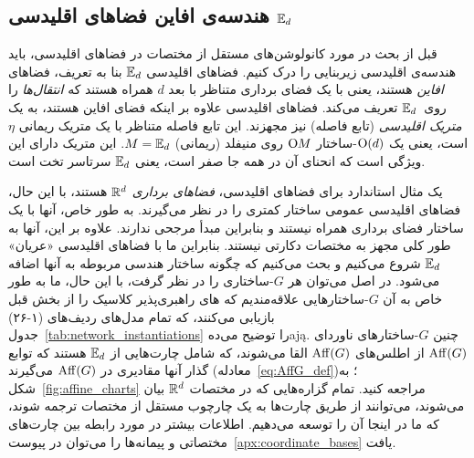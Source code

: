 

\subsection
[هندسه‌ی افاین فضاهای اقلیدسی \texorpdfstring{$\Euc_d$}{}]%
{هندسه‌ی افاین فضاهای اقلیدسی $\Euc_d$}
\label{sec:euclidean_geometry}


قبل از بحث در مورد کانولوشن‌های مستقل از مختصات در فضاهای اقلیدسی، باید هندسه‌ی اقلیدسی زیربنایی را درک کنیم.
فضاهای اقلیدسی $\Euc_d$ بنا به تعریف، فضاهای \emph{افاین} هستند، یعنی با یک فضای برداری متناظر با بعد $d$ همراه هستند که \emph{انتقال‌ها} را روی~$\Euc_d$ تعریف می‌کند.
فضاهای اقلیدسی علاوه بر اینکه فضای افاین هستند، به یک \emph{متریک اقلیدسی} (تابع فاصله) نیز مجهزند.
این تابع فاصله متناظر با یک متریک ریمانی $\eta$ است، یعنی یک $\operatorname{O}(d)$-ساختار $\operatorname{O}\mkern-3.6muM$ روی منیفلد (ریمانی) $M=\mathbb{E}_d$.
این متریک دارای این ویژگی است که انحنای آن در همه جا صفر است، یعنی $\Euc_d$ سرتاسر تخت است.


یک مثال استاندارد برای فضاهای اقلیدسی، \emph{فضاهای برداری} $\mathbb{R}^d$ هستند، با این حال، فضاهای اقلیدسی عمومی ساختار کمتری را در نظر می‌گیرند.
به طور خاص، آنها با یک ساختار فضای برداری همراه نیستند و بنابراین مبدأ مرجحی ندارند.
علاوه بر این، آنها به طور کلی مجهز به مختصات دکارتی نیستند.
بنابراین ما با فضاهای اقلیدسی «عریان» $\Euc_d$ شروع می‌کنیم و بحث می‌کنیم که چگونه ساختار هندسی مربوطه به آنها اضافه می‌شود.
در اصل می‌توان هر $G$-ساختاری را در نظر گرفت، با این حال، ما به طور خاص به آن $G$-ساختارهایی علاقه‌مندیم که های راهبری‌پذیر کلاسیک را از بخش قبل بازیابی می‌کنند، که تمام مدل‌های ردیف‌های (۱-۲۶) جدول~\ref{tab:network_instantiations} را توضیح می‌دهają.
چنین $G$-ساختارهای ناوردای $\operatorname{Aff}(G)$ از اطلس‌های $\operatorname{Aff}(G)$ القا می‌شوند، که شامل چارت‌هایی از $\Euc_d$ هستند که توابع گذار آنها مقادیری در $\operatorname{Aff}(G)$ می‌گیرند (معادله~\eqref{eq:AffG_def})؛ به شکل~\ref{fig:affine_charts} مراجعه کنید.
تمام گزاره‌هایی که در مختصات $\mathbb{R}^d$ بیان می‌شوند، می‌توانند از طریق چارت‌ها به یک چارچوب مستقل از مختصات ترجمه شوند، که ما در اینجا آن را توسعه می‌دهیم.
اطلاعات بیشتر در مورد رابطه بین چارت‌های مختصاتی و پیمانه‌ها را می‌توان در پیوست~\ref{apx:coordinate_bases} یافت.

